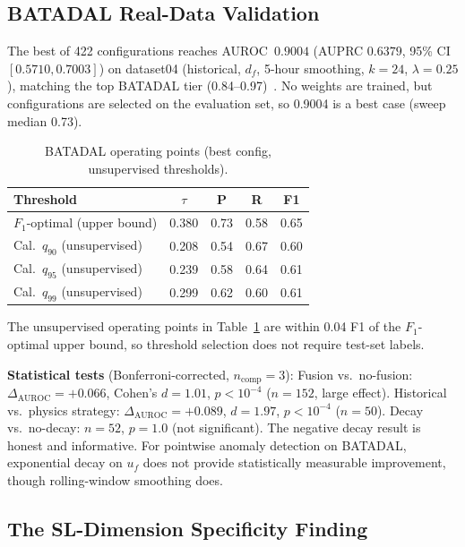 \documentclass[conference]{IEEEtran}
\begin{document}
\subsection{BATADAL Real-Data Validation}

The best of 422 configurations reaches AUROC~$0.9004$ (AUPRC $0.6379$, 95\% CI $[0.5710, 0.7003]$) on dataset04 (historical, $d_f$, 5-hour smoothing, $k=24$, $\lambda=0.25$), matching the top BATADAL tier (0.84--0.97)~\cite{taormina2018battle}. No weights are trained, but configurations are selected on the evaluation set, so 0.9004 is a best case (sweep median 0.73).

\begin{table}[t]
\centering
\caption{BATADAL operating points (best config, unsupervised thresholds).}
\label{tab:batadal-ops}
\footnotesize
\begin{tabular}{@{}lcccc@{}}
\toprule
\textbf{Threshold} & $\tau$ & \textbf{P} & \textbf{R} & \textbf{F1} \\
\midrule
$F_1$-optimal (upper bound) & 0.380 & 0.73 & 0.58 & 0.65 \\
Cal.\ $q_{90}$ (unsupervised) & 0.208 & 0.54 & 0.67 & 0.60 \\
Cal.\ $q_{95}$ (unsupervised) & 0.239 & 0.58 & 0.64 & 0.61 \\
Cal.\ $q_{99}$ (unsupervised) & 0.299 & 0.62 & 0.60 & 0.61 \\
\bottomrule
\end{tabular}
\end{table}

The unsupervised operating points in Table~\ref{tab:batadal-ops} are within 0.04 F1 of the $F_1$-optimal upper bound, so threshold selection does not require test-set labels.

\textbf{Statistical tests} (Bonferroni-corrected, $n_{\text{comp}}=3$):
Fusion vs.\ no-fusion: $\Delta_{\text{AUROC}}=+0.066$, Cohen's $d=1.01$, $p<10^{-4}$ ($n=152$, large effect).
Historical vs.\ physics strategy: $\Delta_{\text{AUROC}}=+0.089$, $d=1.97$, $p<10^{-4}$ ($n=50$).
Decay vs.\ no-decay: $n=52$, $p=1.0$ (not significant). The negative decay result is honest and informative. For pointwise anomaly detection on BATADAL, exponential decay on $u_f$ does not provide statistically measurable improvement, though rolling-window smoothing does.

\subsection{The SL-Dimension Specificity Finding}
\end{document}

